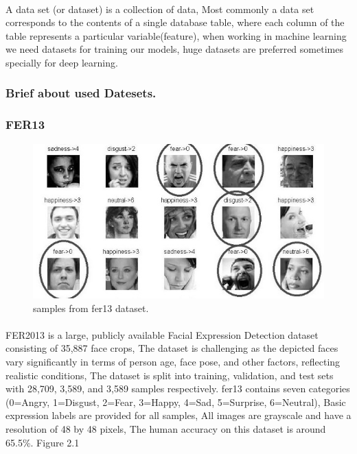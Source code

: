 \paragraph{}
A data set (or dataset) is a collection of data, Most commonly a data set corresponds to the contents of a single database table, where each column of the table represents a particular variable(feature), when working in machine learning we need datasets for training our models, huge datasets are preferred sometimes specially for deep learning.

\subsubsection{Brief about used Datesets.}
\subsubsection{FER13}
\begin{figure}
	\centering
	\includegraphics[width=.5\textwidth]{images/fer2013.jpg}
	\caption{samples from fer13 dataset.}
\end{figure} 
\paragraph{}
FER2013 is a large, publicly available Facial Expression Detection dataset consisting of 35,887 face crops, The dataset is challenging as the depicted faces vary significantly in terms of person age, face pose, and other factors, reflecting realistic conditions, 
The dataset is split into training, validation, and test sets with 28,709, 3,589, and 3,589 samples respectively.\newline
fer13 contains seven categories (0=Angry, 1=Disgust, 2=Fear, 3=Happy, 4=Sad, 5=Surprise, 6=Neutral), Basic expression labels are provided for all samples, All images are grayscale and have a resolution of 48 by 48 pixels, The human accuracy on this dataset is around 65.5\%. Figure 2.1
 
